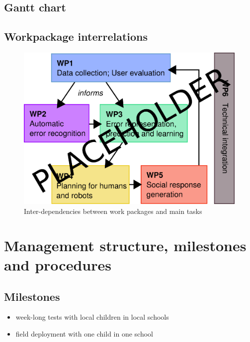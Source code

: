 \documentclass[11pt,a4paper]{report}
\begin{document}
\subsection{Gantt chart}\label{gantt-chart}

\begin{landscape}

\end{landscape}

\subsection{Workpackage interrelations}\label{workpackage-interrelations}

\begin{figure}[!htbp]
    \centering
    \includegraphics[width=0.8\linewidth]{figs/wp-interrelations}
    \caption{Inter-dependencies between work packages and main tasks}
    \label{}
\end{figure}



\section{Management structure, milestones and procedures}\label{management-structure-milestones-and-procedures}

\subsection{Milestones}\label{milestones}

\begin{itemize}

\item   week-long tests with local children in local schools
\item   field deployment with one child in one school
\end{itemize}
\end{document}
